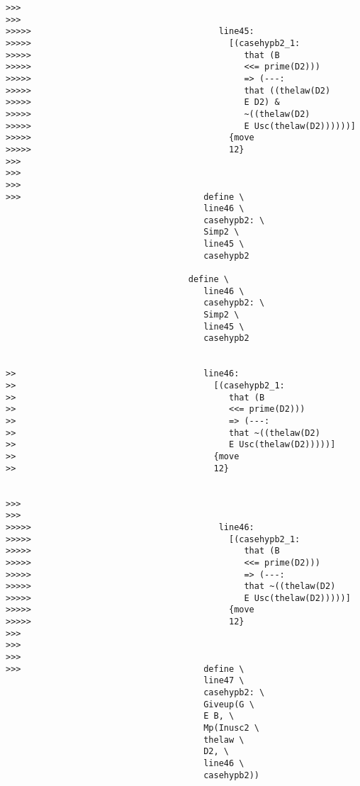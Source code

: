 \documentclass[12pt]{article}
\begin{document}
\begin{verbatim}
>>>
>>>
>>>>>                                     line45:
>>>>>                                       [(casehypb2_1:
>>>>>                                          that (B
>>>>>                                          <<= prime(D2)))
>>>>>                                          => (---:
>>>>>                                          that ((thelaw(D2)
>>>>>                                          E D2) &
>>>>>                                          ~((thelaw(D2)
>>>>>                                          E Usc(thelaw(D2))))))]
>>>>>                                       {move
>>>>>                                       12}
>>>
>>>
>>>
>>>                                    define \
                                       line46 \
                                       casehypb2: \
                                       Simp2 \
                                       line45 \
                                       casehypb2

                                    define \
                                       line46 \
                                       casehypb2: \
                                       Simp2 \
                                       line45 \
                                       casehypb2


>>                                     line46:
>>                                       [(casehypb2_1:
>>                                          that (B
>>                                          <<= prime(D2)))
>>                                          => (---:
>>                                          that ~((thelaw(D2)
>>                                          E Usc(thelaw(D2)))))]
>>                                       {move
>>                                       12}


>>>
>>>
>>>>>                                     line46:
>>>>>                                       [(casehypb2_1:
>>>>>                                          that (B
>>>>>                                          <<= prime(D2)))
>>>>>                                          => (---:
>>>>>                                          that ~((thelaw(D2)
>>>>>                                          E Usc(thelaw(D2)))))]
>>>>>                                       {move
>>>>>                                       12}
>>>
>>>
>>>
>>>                                    define \
                                       line47 \
                                       casehypb2: \
                                       Giveup(G \
                                       E B, \
                                       Mp(Inusc2 \
                                       thelaw \
                                       D2, \
                                       line46 \
                                       casehypb2))


\end{verbatim}
\end{document}
